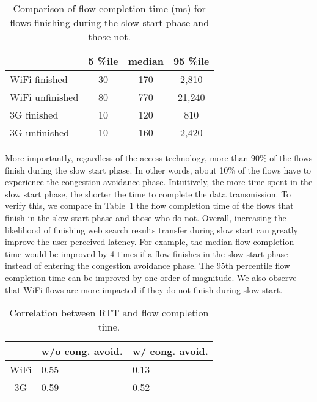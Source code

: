 \begin{table}[th]
\caption{Comparison of flow completion time (ms) for flows finishing during the slow start phase and those not.}
\label{tab:web_finish_time_3rd_phase}
\centering
\renewcommand{\arraystretch}{1.0}
\begin{tabular}{l|c|c|c}
\hline
& 5 \%ile & median & 95 \%ile \\
\hline
WiFi finished & 30 & 170 & 2,810 \\
WiFi unfinished & 80 & 770 & 21,240 \\
\hline
3G finished & 10 & 120 & 810 \\
3G unfinished & 10 & 160 & 2,420 \\
\hline
\end{tabular}
\minsqueeze
\end{table}

More importantly, regardless of the access technology, more than 90\% of the flows finish during the slow start phase. In other words, about 10\% of the flows have to experience the congestion avoidance phase. Intuitively, the more time spent in the slow start phase, the shorter the time to complete the data transmission. To verify this, we compare in Table~\ref{tab:web_finish_time_3rd_phase} the flow completion time of the flows that finish in the slow start phase and those who do not. Overall, increasing the likelihood of finishing web search results transfer during slow start can greatly improve the user perceived latency. For example, the median flow completion time would be improved by 4 times if a flow finishes in the slow start phase instead of entering the congestion avoidance phase. The 95th percentile flow completion time can be improved by one order of magnitude. We also observe that WiFi flows are more impacted if they do not finish during slow start.

\begin{table}[th]
\caption{Correlation between RTT and flow completion time.}
\label{tab:web_rtt_finish_time_correlation}
\centering
\renewcommand{\arraystretch}{1.0}
\begin{tabular}{c|C{2.6cm}|C{2.5cm}}
   \hline
   & w/o cong. avoid. & w/ cong. avoid. \\
   \hline
   WiFi & 0.55 & 0.13 \\
   3G & 0.59 & 0.52 \\
   \hline
\end{tabular}
\minsqueeze
\end{table}

